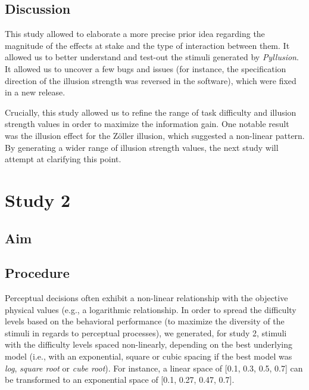 \documentclass[
  man,floatsintext]{apa6}
\begin{document}
\hypertarget{discussion}{%
\subsection{Discussion}\label{discussion}}

This study allowed to elaborate a more precise prior idea regarding the magnitude of the effects at stake and the type of interaction between them. It allowed us to better understand and test-out the stimuli generated by \emph{Pyllusion}. It allowed us to uncover a few bugs and issues (for instance, the specification direction of the illusion strength was reversed in the software), which were fixed in a new release.

Crucially, this study allowed us to refine the range of task difficulty and illusion strength values in order to maximize the information gain. One notable result was the illusion effect for the Zöller illusion, which suggested a non-linear pattern. By generating a wider range of illusion strength values, the next study will attempt at clarifying this point.

\hypertarget{study-2}{%
\section{Study 2}\label{study-2}}

\hypertarget{aim-1}{%
\subsection{Aim}\label{aim-1}}

\hypertarget{procedure-1}{%
\subsection{Procedure}\label{procedure-1}}

Perceptual decisions often exhibit a non-linear relationship with the objective physical values (e.g., a logarithmic relationship. In order to spread the difficulty levels based on the behavioral performance (to maximize the diversity of the stimuli in regards to perceptual processes), we generated, for study 2, stimuli with the difficulty levels spaced non-linearly, depending on the best underlying model (i.e., with an exponential, square or cubic spacing if the best model was \emph{log}, \emph{square root} or \emph{cube root}). For instance, a linear space of {[}0.1, 0.3, 0.5, 0.7{]} can be transformed to an exponential space of {[}0.1, 0.27, 0.47, 0.7{]}.
\end{document}
